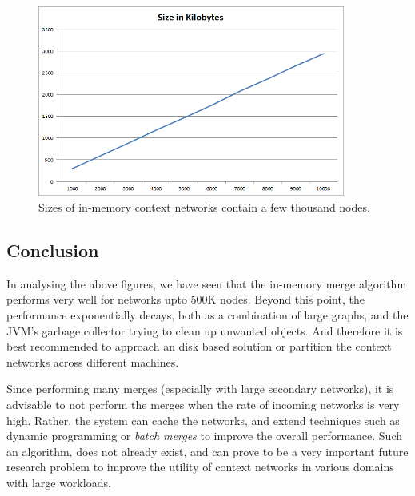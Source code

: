 \begin{figure}[t]
\centering
\includegraphics[width=0.9\textwidth]{media/chapter5/perf/size-tree-1000.png}
\caption{Sizes of in-memory context networks contain a few thousand nodes.}
\label{fig:sizes}
\end{figure}


\subsection{Conclusion}

In analysing the above figures, we have seen that the in-memory merge algorithm performs very well for networks upto 500K nodes. Beyond this point, the performance exponentially decays, both as a combination of large graphs, and the JVM's garbage collector trying to clean up unwanted objects. And therefore it is best recommended to approach an disk based solution or partition the context networks across different machines. 

Since performing many merges (especially with large secondary networks), it is advisable to not perform the merges when the rate of incoming networks is very high. Rather, the system can cache the networks, and extend techniques such as dynamic programming or \textit{batch merges} to improve the overall performance. Such an algorithm, does not already exist, and can prove to be a very important future research problem to improve the utility of context networks in various domains with large workloads.


